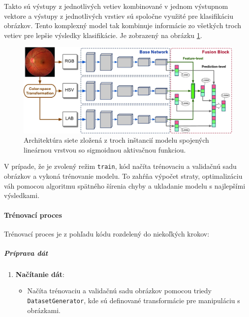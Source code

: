 \documentclass[a4paper, 11pt]{article}
\begin{document}
Takto sú výstupy z jednotlivých vetiev kombinované v jednom výstupnom vektore a výstupy z jednotlivých vrstiev sú spoločne využité pre klasifikáciu obrázkov. Tento komplexný model tak kombinuje informácie zo všetkých troch vetiev pre lepšie výsledky klasifikácie. Je zobrazený na obrázku \ref{fig:network-label}.
\begin{figure}
    \centering
    \includegraphics[width=1\linewidth]{images/network.png}
    \caption{Architektúra siete zložená z troch inštancií modelu spojených lineárnou vrstvou so sigmoidnou aktivačnou funkciou. \cite{evaluation}}
    \label{fig:network-label}
\end{figure}
\vspace{20px}

V prípade, že je zvolený režim \texttt{train}, kód načíta trénovaciu a validačnú sadu obrázkov a vykoná trénovanie modelu. To zahŕňa výpočet straty, optimalizáciu váh pomocou algoritmu spätného šírenia chyby a ukladanie modelu s najlepšími výsledkami.


\paragraph{Trénovací proces}


Trénovací proces je z pohľadu kódu rozdelený do niekoľkých krokov:

\subparagraph{Príprava dát}
\begin{enumerate}
    \item \textbf{Načítanie dát}:
    \begin{itemize}
        \item Načíta trénovaciu a validačnú sadu obrázkov pomocou triedy \texttt{DatasetGenerator}, kde sú definované transformácie pre manipuláciu s obrázkami.
    \end{itemize}
\end{enumerate}
\end{document}
